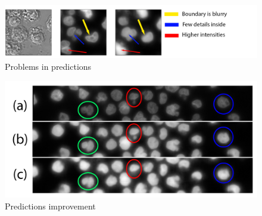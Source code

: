 \begin{figure}[H]
	\begin{center}
		\includegraphics[width=0.8\linewidth]{bilder/nuclei/problems.png}
		\caption{Problems in predictions}\label{fig:nuclei-troubles}
	\end{center}
\end{figure}

\begin{figure}[H]
	\begin{center}
		\includegraphics[width=0.6\linewidth]{bilder/nuclei/bigger-model.png}
		\caption{Predictions improvement}\label{fig:better-nuclei}
	\end{center}
\end{figure}